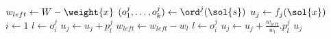 \begin{algorithmic}[1]
  \State $w_{left} \gets W - \weight{x}$
  \State $(o^j_1, \ldots, o^j_k) \gets \ord^j(\sol{s})$
  \State $u_j \gets f_j(\sol{x})$
  \State $i \gets 1$
  \State $l \gets o^j_i$
    \State $u_j \gets u_j + p^j_{l}$
    \State $w_{left} \gets w_{left} - w_l$
  \EndWhile
    \State $l \gets o^j_i$
    \State $u_j \gets u_j + \frac{w_{left}}{w_l}.p^j_{l}$
  \EndIf
  \State \Return $u_j$
\EndFunction
\end{algorithmic}